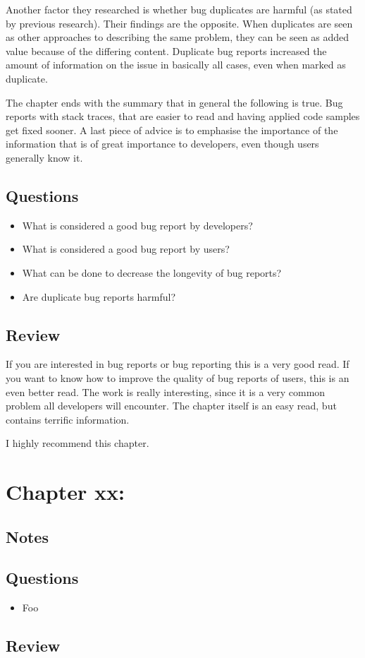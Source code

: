 Another factor they researched is whether bug duplicates are harmful (as stated by previous research). 
Their findings are the opposite. 
When duplicates are seen as other approaches to describing the same problem, they can be seen as added value because of the differing content. 
Duplicate bug reports increased the amount of information on the issue in basically all cases, even when marked as duplicate.

The chapter ends with the summary that in general the following is true.
Bug reports with stack traces, that are easier to read and having applied code samples get fixed sooner.
A last piece of advice is to emphasise the importance of the information that is of great importance to developers, even though users generally know it.

\subsection{Questions}
\begin{itemize}
  \item What is considered a good bug report by developers?
  \item What is considered a good bug report by users?
  \item What can be done to decrease the longevity of bug reports?
  \item Are duplicate bug reports harmful?
\end{itemize}

\subsection{Review}
If you are interested in bug reports or bug reporting this is a very good read. 
If you want to know how to improve the quality of bug reports of users, this is an even better read. 
The work is really interesting, since it is a very common problem all developers will encounter. 
The chapter itself is an easy read, but contains terrific information.

I highly recommend this chapter.

\section{Chapter xx: }
\subsection{Notes}

\subsection{Questions}
\begin{itemize}
  \item Foo
\end{itemize}

\subsection{Review}
